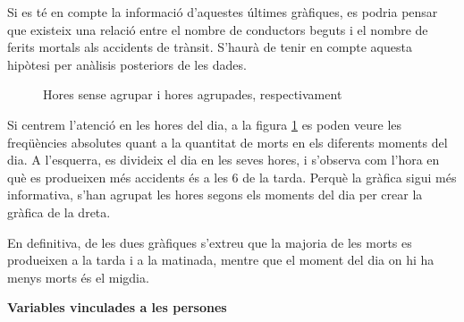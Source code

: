 \documentclass[12pt,longbibliography]{article}
\theoremstyle{definition}
\theoremstyle{remark}
\begin{document}
Si es té en compte la informació d'aquestes últimes gràfiques, es podria pensar que existeix una relació entre el nombre de conductors beguts i el nombre de ferits mortals als accidents de trànsit. S'haurà de tenir en compte aquesta hipòtesi per anàlisis posteriors de les dades.

\begin{figure}[h!]
\par
{}%
\hfill
{}%
\par

\caption{Hores sense agrupar i hores agrupades, respectivament}
\label{fig:G2}
\end{figure}


Si centrem l'atenció en les hores del dia, a la figura \ref{fig:G2} es poden veure les freqüències absolutes quant a la quantitat de morts en els diferents moments del dia. A l'esquerra, es divideix el dia en les seves hores, i s'observa com l'hora en què es produeixen més accidents és a les 6 de la tarda. Perquè la gràfica sigui més informativa, s'han agrupat les hores segons els moments del dia per crear la gràfica de la dreta. 


En definitiva, de les dues gràfiques s'extreu que la majoria de les morts es produeixen a la tarda i a la matinada, mentre que el moment del dia on hi ha menys morts és el migdia.


\textbf{Variables vinculades a les persones}
\end{document}
